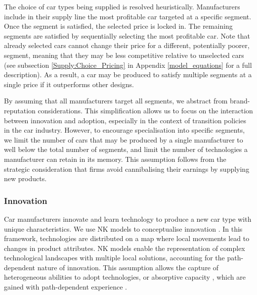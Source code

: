 \documentclass[12pt]{article}
\begin{document}
	The choice of car types being supplied is resolved heuristically. Manufacturers include in their supply line the most profitable car targeted at a specific segment. Once the segment is satisfied, the selected price is locked in. The remaining segments are satisfied by sequentially selecting the most profitable car. Note that already selected cars cannot change their price for a different, potentially poorer, segment, meaning that they may be less competitive relative to unselected cars (see subsection \ref{Supply:Choice_Pricing} in Appendix \ref{model_equations} for a full description). As a result, a car may be produced to satisfy multiple segments at a single price if it outperforms other designs. %
	
	By assuming that all manufacturers target all segments, we abstract from brand-reputation considerations. This simplification allows us to focus on the interaction between innovation and adoption, especially in the context of transition policies in the car industry. However, to encourage specialisation into specific segments, we limit the number of cars that may be produced by a single manufacturer to well below the total number of segments, and limit the number of technologies a manufacturer can retain in its memory. This assumption follows from the strategic consideration that firms avoid cannibalising their earnings by supplying new products.  
	
	\subsubsection{Innovation} \label{Supply:Innovation}
	Car manufacturers innovate and learn technology to produce a new car type with unique characteristics. We use NK models to conceptualise innovation \citep{levinthal1997adaptation,rivkin_2000,baumann_siggelkow_2013}. In this framework, technologies are distributed on a map where local movements lead to changes in product attributes. NK models enable the representation of complex technological landscapes with multiple local solutions, accounting for the path-dependent nature of innovation. This assumption allows the capture of heterogeneous abilities to adopt technologies, or absorptive capacity \citep{cohen1990absorptive}, which are gained with path-dependent experience \citep{nelson1977search}.
	
\end{document}
